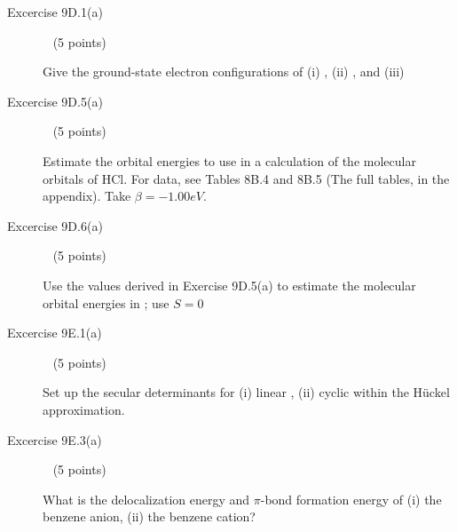 \documentclass[10pt, letterpaper]{memoir}
\begin{document}
\begin{description}
	\vspace{22em}
	\item [Excercise 9D.1(a)] ~ (5 points)
	
	Give the ground-state electron configurations of (i) , (ii) , and (iii) 
	
	\vspace{25em}
	\item [Excercise 9D.5(a)] ~ (5 points)
	
	Estimate the orbital energies to use in a calculation of the molecular orbitals of HCl. For data, see Tables 8B.4 and 8B.5 (The full tables, in the appendix). Take $\beta=-1.00eV$.
	
	\vspace{13em}
	\item [Excercise 9D.6(a)] ~ (5 points)
	
	Use the values derived in Exercise 9D.5(a) to estimate the molecular orbital energies in ; use $S=0$
	
	
	\vspace{15em}
	\item [Excercise 9E.1(a)] ~ (5 points)
	
	Set up the secular determinants for (i) linear , (ii) cyclic  within the H\"uckel approximation.
	
	\vspace{15em}
	\item [Excercise 9E.3(a)] ~ (5 points)
	
	What is the delocalization energy and $\pi$-bond formation energy of (i) the benzene anion, (ii) the benzene cation?
\end{description}
\end{document}
